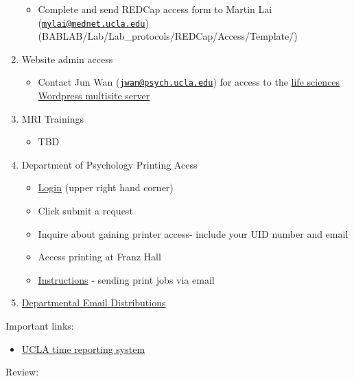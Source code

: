 \documentclass[]{book}
\providecommand{\tightlist}{%
  \setlength{\itemsep}{0pt}\setlength{\parskip}{0pt}}
\begin{document}
\begin{enumerate}
  \begin{itemize}
  \tightlist
  \item
    Complete and send REDCap access form to Martin Lai (\href{mailto:mylai@mednet.ucla.edu}{\nolinkurl{mylai@mednet.ucla.edu}}) (BABLAB/Lab/Lab\_protocols/REDCap/Access/Template/)
  \end{itemize}
\item
  Website admin access

  \begin{itemize}
  \tightlist
  \item
    Contact Jun Wan (\href{mailto:jwan@psych.ucla.edu}{\nolinkurl{jwan@psych.ucla.edu}}) for access to the \href{https://sites.lifesci.ucla.edu/}{life sciences Wordpress multisite server}
  \end{itemize}
\item
  MRI Trainings

  \begin{itemize}
  \tightlist
  \item
    TBD
  \end{itemize}
\item
  Department of Psychology Printing Acess

  \begin{itemize}
  \tightlist
  \item
    \href{https://support.lifesci.ucla.edu/hc/en-us}{Login} (upper right hand corner)
  \item
    Click submit a request
  \item
    Inquire about gaining printer access- include your UID number and email
  \item
    Access printing at Franz Hall
  \item
    \href{https://ucla.app.box.com/s/db0zzvgrydw1yz99yo1nlooq1j4n7jos}{Instructions} - sending print jobs via email
  \end{itemize}
\item
  \href{https://ucla.app.box.com/v/Psych-Directory-List}{Departmental Email Distributions}
\end{enumerate}

Important links:

\begin{itemize}
\tightlist
\item
  \href{24https://uctrs.it.ucla.edu/}{UCLA time reporting system}
\end{itemize}

Review:
\end{document}
